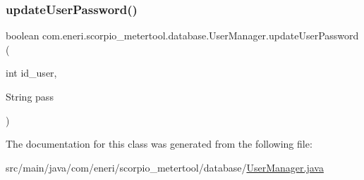 \mbox{\label{classcom_1_1eneri_1_1scorpio__metertool_1_1database_1_1_user_manager_a7fc8140ab4667ec1b0e5ef0d6720ae7e}} 
\subsubsection{\texorpdfstring{update\+User\+Password()}{updateUserPassword()}}
{\footnotesize\ttfamily boolean com.\+eneri.\+scorpio\+\_\+metertool.\+database.\+User\+Manager.\+update\+User\+Password (\begin{DoxyParamCaption}\item[{int}]{id\+\_\+user,  }\item[{String}]{pass }\end{DoxyParamCaption})}



The documentation for this class was generated from the following file\+:\begin{DoxyCompactItemize}
\item 
src/main/java/com/eneri/scorpio\+\_\+metertool/database/\hyperlink{_user_manager_8java}{User\+Manager.\+java}\end{DoxyCompactItemize}
